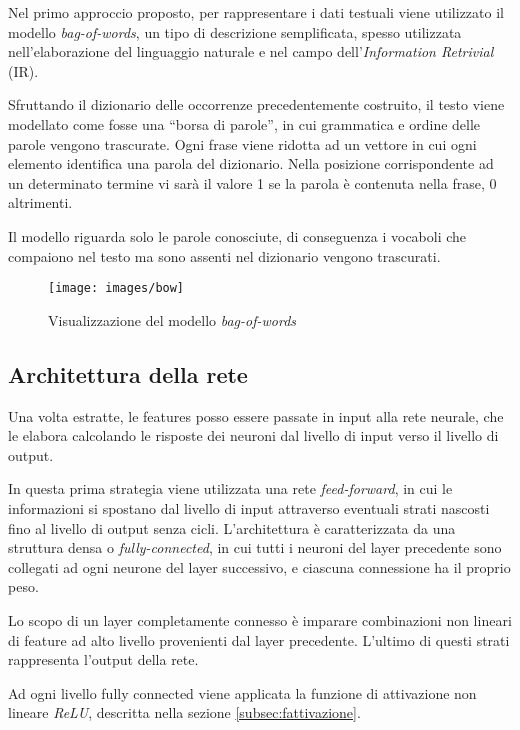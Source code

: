 Nel primo approccio proposto, per rappresentare i dati testuali viene utilizzato il modello \emph{bag-of-words}, un tipo di descrizione semplificata, spesso utilizzata nell'elaborazione del linguaggio naturale e nel campo dell'\emph{Information Retrivial} (IR). 

Sfruttando il dizionario delle occorrenze precedentemente costruito, il testo viene modellato  come fosse una ``borsa di parole'', in cui grammatica e ordine delle parole vengono trascurate.
Ogni frase viene ridotta ad un vettore in cui ogni elemento identifica una parola del dizionario. Nella posizione corrispondente ad un determinato termine vi sarà il valore \num{1} se la parola è contenuta nella frase, \num{0} altrimenti.

Il modello riguarda solo le parole conosciute, di conseguenza i vocaboli che compaiono nel testo ma sono assenti nel dizionario vengono trascurati.

\begin{figure}[H]
	\centering
	{\texttt{[image: images/bow]}}
	\caption{Visualizzazione del modello \emph{bag-of-words}}
	\label{fig:bow}
\end{figure}

\subsection{Architettura della rete}
\label{subsec:modelli1}

Una volta estratte, le features posso essere passate in input alla rete neurale, che le elabora calcolando le risposte dei neuroni dal livello di input verso il livello di output.

In questa prima strategia viene utilizzata una rete \emph{feed-forward}, in cui le informazioni si spostano dal livello di input attraverso eventuali strati nascosti fino al livello di output senza cicli. L'architettura è caratterizzata da una struttura densa o \emph{fully-connected}, in cui tutti i neuroni del layer precedente sono collegati ad ogni neurone del layer successivo, e ciascuna connessione ha il proprio peso.


Lo scopo di un layer completamente connesso è imparare combinazioni non lineari di feature ad alto livello provenienti dal layer precedente. L'ultimo di questi strati rappresenta l’output della rete.

Ad ogni livello fully connected viene applicata la funzione di attivazione non lineare \emph{ReLU}, descritta nella sezione \ref{subsec:fattivazione}.

